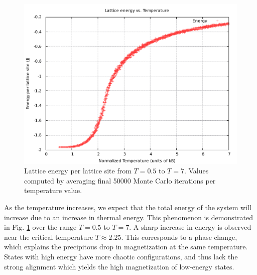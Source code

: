 \documentclass[]{article}
\begin{document}
\begin{figure}[ht!]
 \centering
 \includegraphics[width=\linewidth]{figures/energy_vs_temp.pdf}
 \caption{Lattice energy per lattice site from $T=0.5$ to $T=7$. Values computed by averaging final 50000 Monte Carlo iterations per temperature value.}
 \label{fig:energy_vs_temp}
\end{figure}

As the temperature increases, we expect that the total energy of the system will increase due to an increase in thermal energy. This phenomenon is demonstrated in Fig. \ref{fig:energy_vs_temp} over the range $T=0.5$ to $T=7$. A sharp increase in energy is observed near the critical temperature $T \approx 2.25$. This corresponds to a phase change, which explains the precipitous drop in magnetization at the same temperature. States with high energy have more chaotic configurations, and thus lack the strong alignment which yields the high magnetization of low-energy states.
\end{document}
